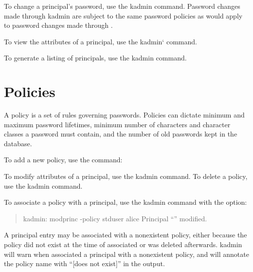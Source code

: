 \documentclass[letterpaper,10pt,english]{sphinxmanual}
\begin{document}
To change a principal’s password, use the kadmin 
command.  Password changes made through kadmin are subject to the same
password policies as would apply to password changes made through
.

To view the attributes of a principal, use the kadmin{}`
 command.

To generate a listing of principals, use the kadmin
 command.


\section{Policies}
\label{\detokenize{admin/database:id2}}\label{\detokenize{admin/database:policies}}
A policy is a set of rules governing passwords.  Policies can dictate
minimum and maximum password lifetimes, minimum number of characters
and character classes a password must contain, and the number of old
passwords kept in the database.

To add a new policy, use the {\hyperref[\detokenize{admin/admin_commands/kadmin_local:kadmin-1}]{}}  command:

%
\begin{sphinxVerbatim}[commandchars=\\\{\}]
      
\end{sphinxVerbatim}

To modify attributes of a principal, use the kadmin 
command.  To delete a policy, use the kadmin 
command.

To associate a policy with a principal, use the kadmin
 command with the  option:
\begin{quote}

kadmin: modprinc -policy stduser alice
Principal “” modified.
\end{quote}

A principal entry may be associated with a nonexistent policy, either
because the policy did not exist at the time of associated or was
deleted afterwards.  kadmin will warn when associated a principal with
a nonexistent policy, and will annotate the policy name with “{[}does
not exist{]}” in the  output.
\end{document}
